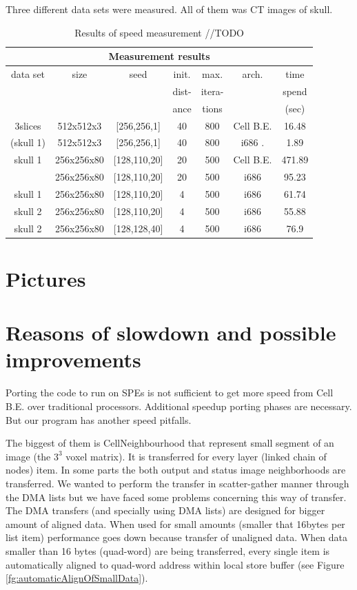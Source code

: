 Three different data sets were measured.
All of them was CT images of skull.

\begin{table}
\centering
\begin{tabular}{|c|c|c|c|c|c|c|}
\hline
\multicolumn{7}{|c|}{Measurement results}\\
\hline
data set		&size		&seed		&init.		&max. 		&arch.		&time\\
			&		&		&dist-		&itera-		&		&spend\\
			&		&		&ance		&tions		&		&(sec)\\
\hline
\hline
3slices 		&512x512x3	&[256,256,1]	&40		&800		&Cell B.E.	&16.48\\
(skull 1)		&512x512x3	&[256,256,1]	&40		&800		&i686	.	&1.89\\
\hline
\hline
skull 1			&256x256x80	&[128,110,20]	&20		&500		&Cell B.E.	&471.89\\
			&256x256x80	&[128,110,20]	&20		&500		&i686		&95.23\\
\hline
\hline
skull 1			&256x256x80	&[128,110,20]	&4		&500		&i686		&61.74\\
\hline
\hline
skull 2			&256x256x80	&[128,110,20]	&4		&500		&i686		&55.88\\
\hline
\hline
skull 2			&256x256x80	&[128,128,40]	&4		&500		&i686		&76.9\\
\hline
\end{tabular}
\par
\caption[Measurement results]
{
  Results of speed measurement //TODO
}
\label{tab:runresults}
\end{table}

\section{Pictures}

\section{Reasons of slowdown and possible improvements}

\par
Porting the code to run on SPEs is not sufficient to get more speed from Cell B.E. over traditional processors.
Additional speedup porting phases are necessary.
But our program has another speed pitfalls.

\par
The biggest of them is CellNeighbourhood that represent small segment of an image (the $3^3$ voxel matrix).
It is transferred for every layer (linked chain of nodes) item.
In some parts the both output and status image neighborhoods are transferred.
We wanted to perform the transfer in scatter-gather manner through the DMA lists but we have faced some problems concerning this way of transfer.
The DMA transfers (and specially using DMA lists) are designed for bigger amount of aligned data.
When used for small amounts (smaller that 16bytes per list item) performance goes down because transfer of unaligned data.
When data smaller than 16 bytes (quad-word) are being transferred, every single item is automatically aligned to quad-word address within local store buffer (see Figure \ref{fg:automaticAlignOfSmallData}).

